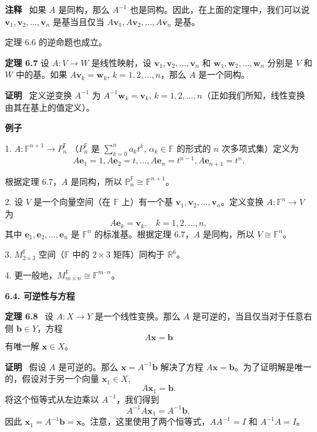 \textbf{注释}~ 如果 $A$ 是同构，那么 $A^{-1}$ 也是同构。因此，在上面的定理中，我们可以说 $\mathbf{v}_1, \mathbf{v}_2, \dots, \mathbf{v}_n$ 是基当且仅当 $A \mathbf{v}_1, A \mathbf{v}_2, \dots, A \mathbf{v}_n$ 是基。

定理 6.6 的逆命题也成立。

\textbf{定理 6.7} 设 $A: V \to W$ 是线性映射，设 $\mathbf{v}_1, \mathbf{v}_2, \dots, \mathbf{v}_n$ 和 $\mathbf{w}_1, \mathbf{w}_2, \dots, \mathbf{w}_n$ 分别是 $V$ 和 $W$ 中的基。如果 $A \mathbf{v}_k = \mathbf{w}_k$, $k = 1, 2, \dots, n$，那么 $A$ 是一个同构。

\textbf{证明}~ 定义逆变换 $A^{-1}$ 为 $A^{-1} \mathbf{w}_k = \mathbf{v}_k$, $k = 1, 2, \dots, n$（正如我们所知，线性变换由其在基上的值定义）。

\textbf{例子}~

1. $A: \mathbb{F}^{n+1} \to P^\mathbb{F}_n$ （$P^\mathbb{F}_n$ 是 $\sum_{k=0}^n a_k t^k$, $\alpha_k \in \mathbb{F}$ 的形式的 $n$ 次多项式集）定义为 
$$A \mathbf{e}_1 = 1, A \mathbf{e}_2 = t, \dots, A \mathbf{e}_n = t^{n-1}, A \mathbf{e}_{n+1} = t^n.$$

根据定理 6.7，$A$ 是同构，所以 $\mathbb{P}^\mathbb{F}_n \cong \mathbb{F}^{n+1}$。

2. 设 $V$ 是一个向量空间（在 $\mathbb{F}$ 上）有一个基 $\mathbf{v}_1, \mathbf{v}_2, \dots, \mathbf{v}_n$。定义变换 $A: \mathbb{F}^n \to V$ 为 
$$A \mathbf{e}_k = \mathbf{v}_k,~~~~k = 1, 2, \dots, n,$$
其中 $\mathbf{e}_1, \mathbf{e}_2, \dots, \mathbf{e}_n$ 是 $\mathbb{F}^n$ 的标准基。根据定理 6.7，$A$ 是同构，所以 $V \cong \mathbb{F}^n$。

3. $M^\mathbb{F}_{2 \times 3}$ 空间（$\mathbb{F}$ 中的 $2 \times 3$ 矩阵）同构于 $\mathbb{R}^6$。

4. 更一般地，$M^\mathbb{F}_{m \times n} \cong \mathbb{F}^{m \cdot n}$。

\textbf{6.4. 可逆性与方程}

\textbf{定理 6.8} ~设 $A: X \to Y$ 是一个线性变换。那么 $A$ 是可逆的，当且仅当对于任意右侧 $\mathbf{b} \in Y$，方程 $$A \mathbf{x} = \mathbf{b}$$ 有唯一解 $\mathbf{x} \in X$。

\textbf{证明}~ 假设 $A$ 是可逆的。那么 $\mathbf{x} = A^{-1} \mathbf{b}$ 解决了方程 $A \mathbf{x} = \mathbf{b}$。为了证明解是唯一的，假设对于另一个向量 $\mathbf{x}_1 \in X$, 
$$A \mathbf{x}_1 = \mathbf{b}.$$
将这个恒等式从左边乘以 $A^{-1}$，我们得到 $$A^{-1} A \mathbf{x}_1 = A^{-1} \mathbf{b},$$
因此 $\mathbf{x}_1 = A^{-1} \mathbf{b} = \mathbf{x}$。注意，这里使用了两个恒等式，$AA^{-1} = I$ 和 $A^{-1} A = I$。

